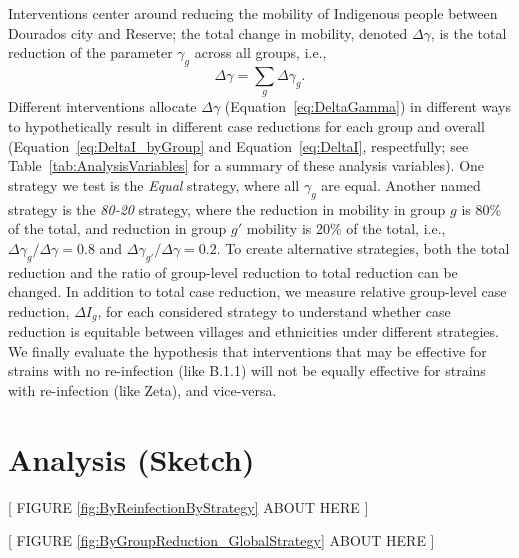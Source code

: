 \documentclass[
  letterpaper,
  abstract]{scrartcl}
\begin{document}
Interventions center around reducing the mobility of Indigenous people between
Dourados city and Reserve; the total change in mobility, denoted $\Delta
\gamma$, is the total reduction of the parameter $\gamma_g$ across all 
groups, i.e., 
\begin{equation}
  \Delta \gamma = \sum_g \Delta \gamma_g.
  \label{eq:DeltaGamma}
\end{equation}
\noindent
Different interventions allocate $\Delta \gamma$ (Equation~\ref{eq:DeltaGamma})
in different ways to hypothetically result in different case reductions for each
group and overall (Equation~\ref{eq:DeltaI_byGroup} and Equation~\ref{eq:DeltaI},
respectfully; see Table~\ref{tab:AnalysisVariables} for a summary of these analysis
variables).
One strategy we test is the \emph{Equal} strategy, where all $\gamma_g$ are
equal. Another named strategy is the \emph{80-20} strategy, where the
reduction in mobility in group $g$ is 80\% of the total, and reduction in
group $g'$ mobility is 20\% of the total, i.e., $\Delta\gamma_g / \Delta\gamma =
0.8$ and $\Delta\gamma_{g'} / \Delta\gamma = 0.2$. To create alternative
strategies, both the total reduction and the ratio of group-level reduction to 
total reduction can be changed. In addition to total case reduction, we 
measure relative group-level case reduction, $\Delta I_g$, 
for each considered strategy to understand whether case reduction is equitable
between villages and ethnicities under different strategies. 
We finally evaluate the hypothesis that interventions that may be effective for
strains with no re-infection (like B.1.1) will not be equally effective for
strains with re-infection (like Zeta), and vice-versa. 


\section{Analysis (Sketch)}\label{analysis-sketch}




\vspace{0.5em}
\begin{center}
{[ FIGURE \ref{fig:ByReinfectionByStrategy} ABOUT HERE ]} \\
\end{center}

\vspace{0.5em}
\begin{center}
{[ FIGURE \ref{fig:ByGroupReduction_GlobalStrategy} ABOUT HERE ]} \\
\end{center}
\end{document}
